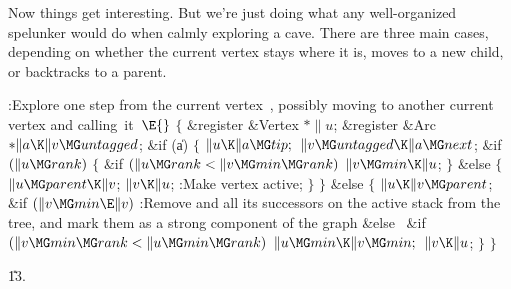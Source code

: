 Now things get interesting. But we're just doing what any well-organized
spelunker would do when calmly exploring a cave.
There are three main cases,
depending on whether the current vertex stays where it is, moves
to a new child, or backtracks to a parent.

\Y\B\4:Explore one step from the current vertex~, possibly moving
to another current vertex and calling~it~\X${}\E{}$\6
${}\{{}$\5
\1\&{register} \&{Vertex} ${}{*}\|u{}$;\6
\&{register} \&{Arc} ${}{*}\|a\K\|v\MG\\{untagged}{}$;\7
\&{if} (\|a)\5
${}\{{}$\1\6
${}\|u\K\|a\MG\\{tip};{}$\6
${}\|v\MG\\{untagged}\K\|a\MG\\{next}{}$;\6
\&{if} ${}(\|u\MG\\{rank}){}$\5
${}\{{}$\1\6
\&{if} ${}(\|u\MG\\{rank}<\|v\MG\\{min}\MG\\{rank}){}$\1\5
${}\|v\MG\\{min}\K\|u{}$;\2%
\6
\4${}\}{}$\5
\2\&{else}\5
${}\{{}$\1\6
${}\|u\MG\\{parent}\K\|v{}$;\6
${}\|v\K\|u{}$;\6
:Make vertex  active\X;\6
\4${}\}{}$\2\6
\4${}\}{}$\5
\2\&{else}\5
${}\{{}$\1\6
${}\|u\K\|v\MG\\{parent}{}$;\6
\&{if} ${}(\|v\MG\\{min}\E\|v){}$\1\5
:Remove  and all its successors on the active stack from the tree,
and mark them as a strong component of the graph\X\2\6
\&{else}\6
\, \&{if} ${}(\|v\MG\\{min}\MG\\{rank}<\|u\MG\\{min}\MG\\{rank}){}$\1\5
${}\|u\MG\\{min}\K\|v\MG\\{min};{}$\2\6
${}\|v\K\|u{}$;\6
\4${}\}{}$\2\6
\4${}\}{}$\2\par
\U13.\fi

